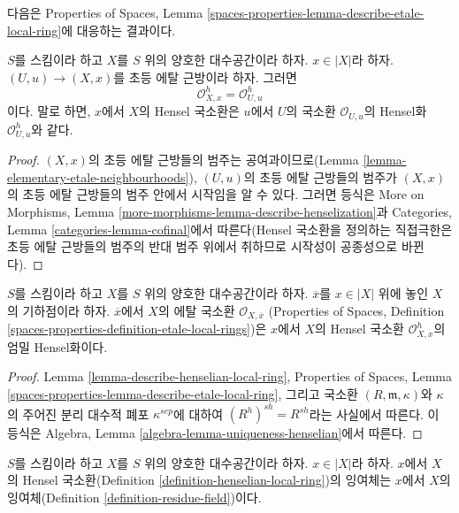 \noindent
다음은 Properties of Spaces, Lemma
\ref{spaces-properties-lemma-describe-etale-local-ring}에 대응하는
결과이다.

\begin{lemma}
\label{lemma-describe-henselian-local-ring}
$S$를 스킴이라 하고 $X$를 $S$ 위의 양호한 대수공간이라 하자.
$x \in |X|$라 하자. $(U, u) \to (X, x)$를 초등 에탈 근방이라 하자.
그러면
$$
\mathcal{O}_{X, x}^h = \mathcal{O}_{U, u}^h
$$
이다. 말로 하면, $x$에서 $X$의 Hensel 국소환은 $u$에서 $U$의
국소환 $\mathcal{O}_{U, u}$의 Hensel화 $\mathcal{O}_{U, u}^h$와 같다.
\end{lemma}

\begin{proof}
$(X, x)$의 초등 에탈 근방들의 범주는 공여과이므로(Lemma
\ref{lemma-elementary-etale-neighbourhoods}), $(U, u)$의 초등 에탈
근방들의 범주가 $(X, x)$의 초등 에탈 근방들의 범주 안에서
시작임을 알 수 있다.
그러면 등식은 More on Morphisms, Lemma
\ref{more-morphisms-lemma-describe-henselization}과 Categories, Lemma
\ref{categories-lemma-cofinal}에서 따른다(Hensel 국소환을 정의하는
직접극한은 초등 에탈 근방들의 범주의 반대 범주 위에서 취하므로
시작성이 공종성으로 바뀐다).
\end{proof}

\begin{lemma}
\label{lemma-henselian-local-ring-strict}
$S$를 스킴이라 하고 $X$를 $S$ 위의 양호한 대수공간이라 하자.
$\overline{x}$를 $x \in |X|$ 위에 놓인 $X$의 기하점이라 하자.
$\overline{x}$에서 $X$의 에탈 국소환 $\mathcal{O}_{X, \overline{x}}$
(Properties of Spaces, Definition
\ref{spaces-properties-definition-etale-local-rings})은 $x$에서 $X$의
Hensel 국소환 $\mathcal{O}_{X, x}^h$의 엄밀 Hensel화이다.
\end{lemma}

\begin{proof}
Lemma \ref{lemma-describe-henselian-local-ring}, Properties of Spaces,
Lemma \ref{spaces-properties-lemma-describe-etale-local-ring}, 그리고
국소환 $(R, \mathfrak m, \kappa)$와 $\kappa$의 주어진 분리 대수적 폐포
$\kappa^{sep}$에 대하여 $(R^h)^{sh} = R^{sh}$라는 사실에서 따른다.
이 등식은 Algebra, Lemma \ref{algebra-lemma-uniqueness-henselian}에서
따른다.
\end{proof}

\begin{lemma}
\label{lemma-residue-field-henselian-local-ring}
$S$를 스킴이라 하고 $X$를 $S$ 위의 양호한 대수공간이라 하자.
$x \in |X|$라 하자. $x$에서 $X$의 Hensel 국소환(Definition
\ref{definition-henselian-local-ring})의 잉여체는 $x$에서 $X$의
잉여체(Definition \ref{definition-residue-field})이다.
\end{lemma}

